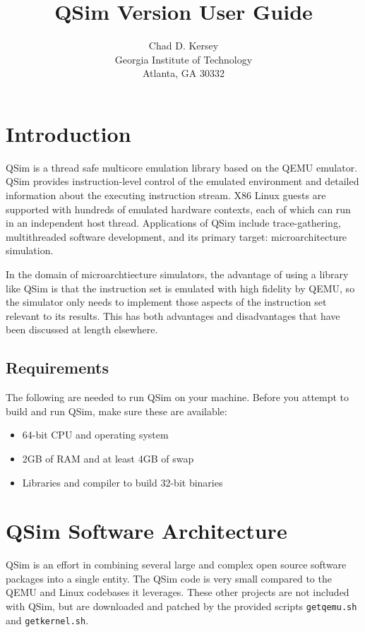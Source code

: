 \documentclass[letterpaper, 10pt]{book}
\title{QSim Version \version User Guide}
\author{Chad D. Kersey\\ Georgia Institute of Technology\\ Atlanta, GA 30332}
\begin{document}
\maketitle

\setcounter{tocdepth}{1}
\tableofcontents

\chapter*{Introduction}
QSim is a thread safe multicore emulation library based on the QEMU emulator.
QSim provides instruction-level control of the emulated environment and 
detailed information about the executing instruction stream. X86 Linux guests
are supported with hundreds of emulated hardware contexts, each of which can run
in an independent host thread. Applications of QSim include trace-gathering,
multithreaded software development, and its primary target: microarchitecture
simulation.

In the domain of microarchtiecture simulators, the advantage of using a library
like QSim is that the instruction set is emulated with high fidelity by QEMU, so
the simulator only needs to implement those aspects of the instruction set
relevant to its results. This has both advantages and disadvantages that have
been discussed at length elsewhere.


\section{Requirements}
The following are needed to run QSim on your machine. Before you attempt to build and run QSim, make sure these are available:

\begin{itemize}
  \item{64-bit CPU and operating system}
  \item{2GB of RAM and at least 4GB of swap}
  \item{Libraries and compiler to build 32-bit binaries}
\end{itemize}

\chapter{QSim Software Architecture} \label{chap:arch}
QSim is an effort in combining several large and complex open source software
packages into a single entity. The QSim code is very small compared to the
QEMU and Linux codebases it leverages. These other projects are not included
with QSim, but are downloaded and patched by the provided scripts
\texttt{getqemu.sh} and \texttt{getkernel.sh}.
\end{document}
